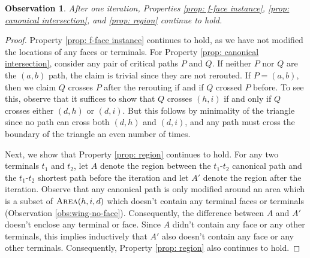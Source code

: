 \documentclass[11pt]{article}
\newtheorem{observation}[theorem]{Observation}
\begin{document}
\begin{observation}\label{obs:prop123}
    After one iteration, Properties \ref{prop: f-face instance}, \ref{prop: canonical intersection}, and \ref{prop: region} continue to hold.
\end{observation}
\begin{proof}
Property \ref{prop: f-face instance} continues to hold, as we have not modified the locations of any faces or terminals.
%
    For Property \ref{prop: canonical intersection}, consider any pair of critical paths $P$ and $Q$. If neither $P$ nor $Q$ are the $(a,b)$ path, the claim is trivial since they are not rerouted. If $P=(a,b)$, then we claim $Q$ crosses $P$ after the rerouting if and if $Q$ crossed $P$ before. To see this, observe that it suffices to show that $Q$ crosses $(h,i)$ if and only if $Q$ crosses either $(d,h)$ or $(d,i)$. But this follows by minimality of the triangle since no path can cross both $(d,h)$ and $(d,i)$, and any path must cross the boundary of the triangle an even number of times. 
    
    Next, we show that Property \ref{prop: region} continues to hold. For any two terminals $t_1$ and $t_2$, let $A$ denote the region between the $t_1$-$t_2$ canonical path and the $t_1$-$t_2$ shortest path before the iteration and let $A'$ denote the region after the iteration. Observe that any canonical path is only modified around an area which is a subset of $\textsc{Area}(h,i,d)$ which doesn't contain any terminal faces or terminals (Observation \ref{obs:wing-no-face}). Consequently, the difference between $A$ and $A'$ doesn't enclose any terminal or face. Since $A$ didn't contain any face or any other terminals, this implies inductively that $A'$ also doesn't contain any face or any other terminals. Consequently, Property \ref{prop: region} also continues to hold. 
\end{proof}
\end{document}
